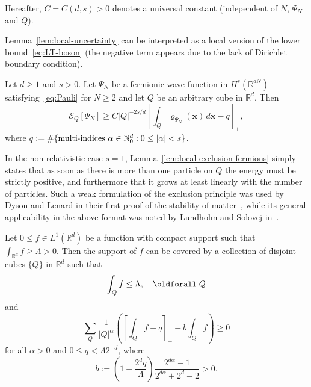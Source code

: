 \documentclass[AHL, Unicode, longabstracts, published]{cedram}
\newcommand*\N {\mathbb{N}}
\newcommand*\R {\mathbb{R}}
\newcommand\1{{\ensuremath {\mathds 1} }}
\newcommand{\bx}{\mathbf{x}}
\newcommand{\cE}{\mathcal{E}}
\renewcommand*{\forall}{\mathrel{\oldforall}}
\begin{document}
Hereafter, $C=C(d,s)>0$ denotes a universal constant (independent of $N$, $\Psi_N$ and $Q$).

Lemma~\ref{lem:local-uncertainty} can be interpreted as a local version of the lower bound~\eqref{eq:LT-boson} (the negative term appears due to the lack of Dirichlet boundary condition).


\begin{lemm}\label{lem:local-exclusion-fermions}
Let $d\ge 1$ and $s>0$. Let $\Psi_N$ be a fermionic wave function in $H^s(\R^{dN})$ satisfying~\eqref{eq:Pauli} for $N \ge 2$ and let $Q$ be an arbitrary cube in $\R^d$. Then
\begin{equation}\label{eq:local-exclusion}
\cE_Q[\Psi_N] \ge C |Q|^{-2s/d} \left[\int_Q \varrho_{\Psi_N}(\bx)\,d\bx - q \right]_+,
\end{equation}
where $q := \# \{ \textup{multi-indices}\ \alpha \in \N_0^d : 0 \le |\alpha|<s \}$.
\end{lemm}

In the non-relativistic case $s=1$, Lemma~\ref{lem:local-exclusion-fermions} simply states that as soon as there is more than one particle on $Q$ the energy must be strictly positive, and furthermore that it grows at least linearly with the number of particles. Such a weak formulation of the exclusion principle was used by Dyson and Lenard in their first proof of the stability of matter~\cite{DysLen-67}, while its general applicability in the above format was noted by Lundholm and Solovej in~\cite{LunSol-13a,LunSol-13b}.

\begin{lemm} \label{lem:covering}
Let $0\le f\in L^1(\R^d)$ be a function with compact support such that $\int_{\R^d} f \ge \Lambda>0$. Then the support of $f$ can be covered by a collection of disjoint cubes $\{Q\}$ in $\R^d$ such that
\begin{equation}\label{eq:covering-0}
\int_{Q} f \le \Lambda, \quad \forall Q
\end{equation}
and
\begin{equation}\label{eq:covering}
\sum_{Q} \frac{1}{|Q|^{\alpha}} \left(\left[\int_{Q} f - q \right]_+ - b \int_{Q} f \right) \ge 0
\end{equation}
for all $\alpha>0$ and $0\le q< \Lambda 2^{-d}$, where
\[
b:= \left(1- \frac{2^dq}{\Lambda} \right) \frac{2^{d\alpha}-1}{2^{d\alpha} + 2^d - 2}>0.
\]
\end{lemm}
\end{document}
